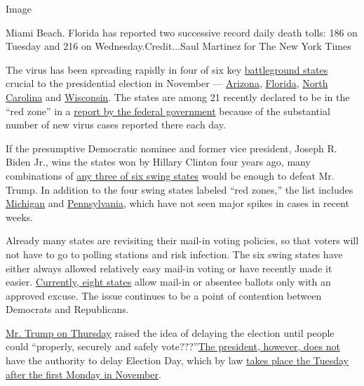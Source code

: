 Image

Miami Beach. Florida has reported two successive record daily death
tolls: 186 on Tuesday and 216 on Wednesday.Credit...Saul Martinez for
The New York Times

The virus has been spreading rapidly in four of six key
\href{https://www.nytimes3xbfgragh.onion/2020/06/25/upshot/poll-2020-biden-battlegrounds.html}{battleground
states} crucial to the presidential election in November ---
\href{https://www.nytimes3xbfgragh.onion/interactive/2020/us/arizona-coronavirus-cases.html}{Arizona},
\href{https://www.nytimes3xbfgragh.onion/interactive/2020/us/florida-coronavirus-cases.html}{Florida},
\href{https://www.nytimes3xbfgragh.onion/interactive/2020/us/north-carolina-coronavirus-cases.html}{North
Carolina} and
\href{https://www.nytimes3xbfgragh.onion/interactive/2020/us/wisconsin-coronavirus-cases.html}{Wisconsin}.
The states are among 21 recently declared to be in the ``red zone'' in a
\href{https://www.nytimes3xbfgragh.onion/interactive/2020/07/28/us/states-report-virus-response-july-26.html}{report
by the federal government} because of the substantial number of new
virus cases reported there each day.

If the presumptive Democratic nominee and former vice president, Joseph
R. Biden Jr., wins the states won by Hillary Clinton four years ago,
many combinations of
\href{https://www.nytimes3xbfgragh.onion/2020/06/29/us/politics/trump-swing-voters.html}{any
three of six swing states} would be enough to defeat Mr. Trump. In
addition to the four swing states labeled ``red zones,'' the list
includes
\href{https://www.nytimes3xbfgragh.onion/interactive/2020/us/michigan-coronavirus-cases.html}{Michigan}
and
\href{https://www.nytimes3xbfgragh.onion/interactive/2020/us/pennsylvania-coronavirus-cases.html}{Pennsylvania},
which have not seen major spikes in cases in recent weeks.

Already many states are revisiting their mail-in voting policies, so
that voters will not have to go to polling stations and risk infection.
The six swing states have either always allowed relatively easy mail-in
voting or have recently made it easier.
\href{https://www.washingtonpost.com/graphics/2020/politics/vote-by-mail-states/}{Currently,
eight states} allow mail-in or absentee ballots only with an approved
excuse. The issue continues to be a point of contention between
Democrats and Republicans.

\href{https://twitter.com/realDonaldTrump/status/1288818160389558273}{Mr.
Trump on Thursday} raised the idea of delaying the election until people
could ``properly, securely and safely
vote???''\href{https://www.nytimes3xbfgragh.onion/2020/05/12/us/politics/kushner-election-november.html}{The
president, however, does not} have the authority to delay Election Day,
which by law
\href{https://www.loc.gov/law/help/statutes-at-large/28th-congress/session-2/c28s2ch1.pdf}{takes
place the Tuesday after the first Monday in November}.

